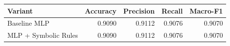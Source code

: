 \begin{tabular}{lrrrr}
\hline
Variant & Accuracy & Precision & Recall & Macro-F1 \\
\hline
Baseline MLP & 0.9090 & 0.9112 & 0.9076 & 0.9070 \\
MLP + Symbolic Rules & 0.9090 & 0.9112 & 0.9076 & 0.9070 \\
\hline
\end{tabular}
